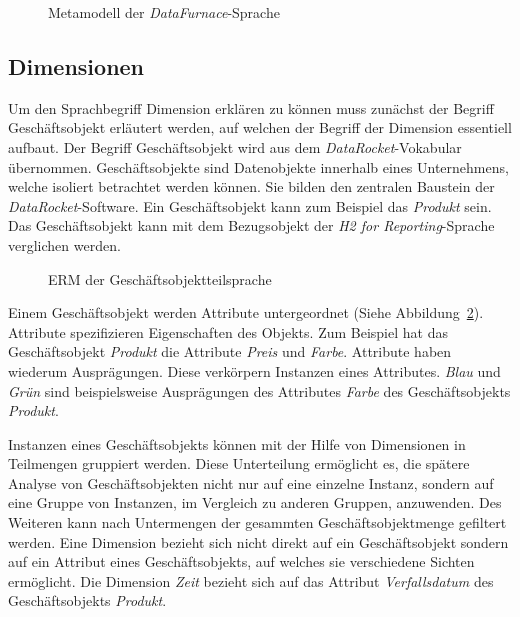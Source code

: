 \documentclass[
  language=german, %
  type=bachelor,%
  ngerman
]{isthesis}
\begin{document}
\begin{content}
  \begin{figure}
    \resizebox{\columnwidth}{!}{}
    \caption{Metamodell der \textit{DataFurnace}-Sprache}\label{fig:language_spec-erm}
  \end{figure}

  \subsection{Dimensionen}\label{subsec:dimension}

	Um den Sprachbegriff Dimension erklären zu können muss zunächst der Begriff
	Geschäftsobjekt erläutert werden, auf welchen der Begriff der Dimension
	essentiell aufbaut. Der Begriff Geschäftsobjekt wird aus dem
	\textit{DataRocket}-Vokabular übernommen. Geschäftsobjekte sind Datenobjekte
	innerhalb eines Unternehmens, welche isoliert betrachtet werden können. Sie
	bilden den zentralen Baustein der \textit{DataRocket}-Software. Ein
	Geschäftsobjekt kann zum Beispiel das \textit{Produkt} sein.  Das
	Geschäftsobjekt kann mit dem Bezugsobjekt der \textit{H2 for
	Reporting}-Sprache verglichen werden.

  \begin{figure}
    \resizebox{200px}{!}{}
    \caption{\acrshort{ERM} der Geschäftsobjektteilsprache}\label{geschaeftsobjekt}
  \end{figure}

  Einem Geschäftsobjekt werden Attribute untergeordnet (Siehe
  Abbildung~\ref{geschaeftsobjekt}). Attribute spezifizieren Eigenschaften des
  Objekts. Zum Beispiel hat das Geschäftsobjekt \textit{Produkt} die Attribute
  \textit{Preis} und \textit{Farbe}. Attribute haben wiederum Ausprägungen.
  Diese verkörpern Instanzen eines Attributes. \textit{Blau} und \textit{Grün}
  sind beispielsweise Ausprägungen des Attributes \textit{Farbe} des
  Geschäftsobjekts \textit{Produkt}.

	Instanzen eines Geschäftsobjekts können mit der Hilfe von Dimensionen in
	Teilmengen gruppiert werden. Diese Unterteilung ermöglicht es, die spätere
	Analyse von Geschäftsobjekten nicht nur auf eine einzelne Instanz, sondern
	auf eine Gruppe von Instanzen, \ggf{} im Vergleich zu anderen Gruppen,
	anzuwenden. Des Weiteren kann nach Untermengen der gesammten
	Geschäftsobjektmenge gefiltert werden.  Eine Dimension bezieht sich nicht
	direkt auf ein Geschäftsobjekt sondern auf ein Attribut eines
	Geschäftsobjekts, auf welches sie verschiedene Sichten ermöglicht. Die
	Dimension \textit{Zeit} bezieht sich \zB{} auf das Attribut
	\textit{Verfallsdatum} des Geschäftsobjekts \textit{Produkt}. 


\end{content}
\end{document}
